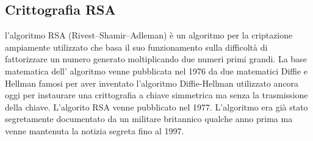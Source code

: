 \begin{itemize}
\chapter{Crittografia RSA}
l'algoritmo RSA (Rivest–Shamir–Adleman) è un algoritmo per la criptazione ampiamente utilizzato che basa il suo funzionamento sulla difficoltà di fattorizzare un numero generato moltiplicando due numeri primi grandi. La base matematica dell' algoritmo venne pubblicata nel 1976 da due matematici Diffie e Hellman famosi per aver inventato l'algoritmo Diffie-Hellman utilizzato ancora oggi per instaurare una crittografia a chiave simmetrica ma senza la trasmissione della chiave. L'algorito RSA venne pubblicato nel 1977. L'algoritmo era già stato segretamente documentato da un militare britannico qualche anno prima ma venne mantenuta la notizia segreta fino al 1997.
 

\end{itemize}
